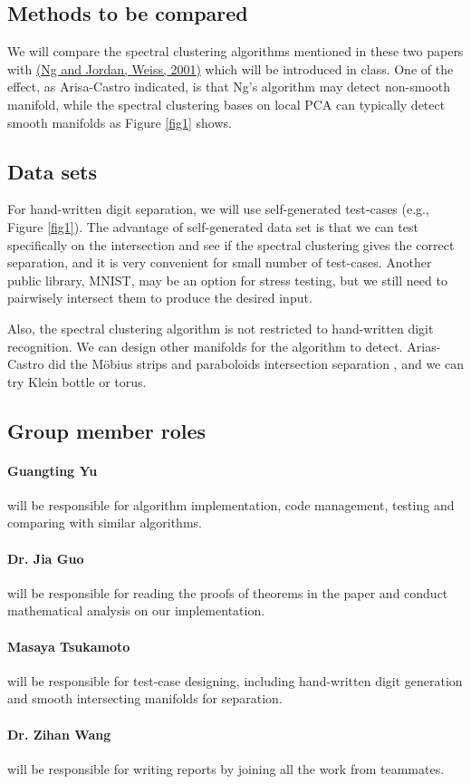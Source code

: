 \documentclass[10pt,twocolumn]{article}
\begin{document}
\subsection*{Methods to be compared}
We will compare the spectral clustering algorithms mentioned in these two papers with \href{https://papers.nips.cc/paper/2092-on-spectral-clustering-analysis-and-an-algorithm.pdf}{(Ng and Jordan, Weiss, 2001)}\cite{Ng:2001:SCA:2980539.2980649} which will be introduced in class.
One of the effect, as Arisa-Castro indicated, is that Ng's algorithm may detect non-smooth manifold, while the spectral clustering bases on local PCA can typically detect smooth manifolds as Figure \ref{fig1} shows.\cite{Arias-Castro:2017:SCB:3122009.3122018}


\subsection*{Data sets}
For hand-written digit separation, we will use self-generated test-cases (e.g., Figure \ref{fig1}).
The advantage of self-generated data set is that we can test specifically on the intersection and see if the spectral clustering gives the correct separation, and it is very convenient for small number of test-cases.
Another public library, MNIST, may be an option for stress testing, but we still need to pairwisely intersect them to produce the desired input.

Also, the spectral clustering algorithm is not restricted to hand-written digit recognition.
We can design other manifolds for the algorithm to detect.
Arias-Castro did the M\"{o}bius strips and paraboloids intersection separation \cite{Arias-Castro:2017:SCB:3122009.3122018}, and we can try Klein bottle or torus.

\subsection*{Group member roles}
\paragraph{Guangting Yu} will be responsible for algorithm implementation, code management, testing and comparing with similar algorithms.
\paragraph{Dr. Jia Guo} will be responsible for reading the proofs of theorems in the paper and conduct mathematical analysis on our implementation.
\paragraph{Masaya Tsukamoto} will be responsible for test-case designing, including hand-written digit generation and smooth intersecting manifolds for separation.
\paragraph{Dr. Zihan Wang} will be responsible for writing reports by joining all the work from teammates.

\newpage
{}

\end{document}
